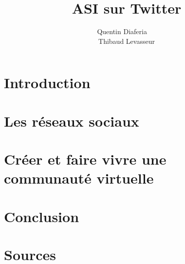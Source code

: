 \documentclass[a4paper,12pt]{article}
\title{ASI sur Twitter}
\author{Quentin Diaferia ~~\\ Thibaud Levasseur}
\begin{document}
\maketitle
\newpage
\tableofcontents
\newpage
\section{Introduction}

\section{Les réseaux sociaux}

\section{Créer et faire vivre une communauté virtuelle}

\section{Conclusion}
\section{Sources}

\end{document}
